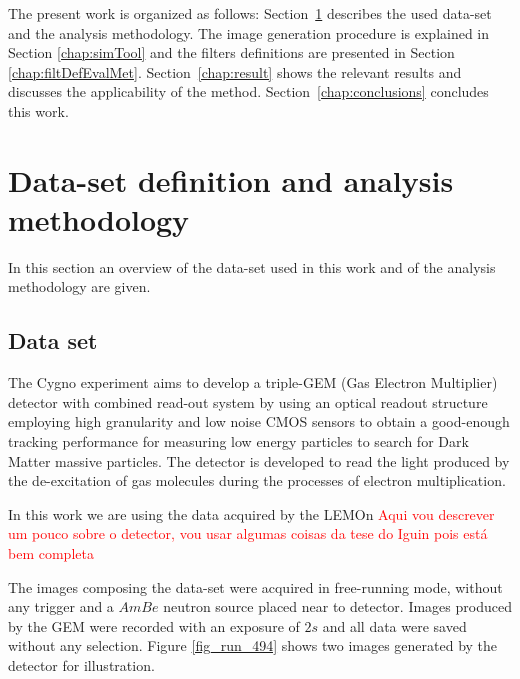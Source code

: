 \documentclass[
        oneside,      %
        english,			
        brazil			 
        ]{abntbibufjf}
\begin{document}
The present work is organized as follows: Section~\ref{chap:metho} describes the used data-set and the analysis methodology. The image generation procedure is explained in Section \ref{chap:simTool} and the filters definitions are presented in Section \ref{chap:filtDefEvalMet}. Section~\ref{chap:result} shows the relevant results and discusses the applicability of the method. Section~\ref{chap:conclusions} concludes this work.


\section{Data-set definition and analysis methodology}
\label{chap:metho}

In this section an overview of the data-set used in this work and of the analysis methodology are given. 


\subsection{Data set}

The  Cygno  experiment  aims  to  develop  a  triple-GEM (Gas Electron Multiplier) detector  with combined read-out system by using an optical readout structure employing high granularity and low noise CMOS sensors to obtain a good-enough tracking performance for measuring low energy particles to search for Dark Matter massive particles. The detector is developed to read the light produced by the de-excitation of gas molecules during the processes of electron multiplication.



In this work we are using the data acquired by the LEMOn
\textcolor{red}{Aqui vou descrever um pouco sobre o detector, vou usar algumas coisas da tese do Iguin pois está bem completa}



The images composing the data-set were acquired in free-running mode, without any trigger and a $AmBe$ neutron source placed near to detector. Images produced by the GEM were recorded with an exposure of $2s$ and all data were saved without any selection. Figure \ref{fig_run_494} shows two images generated by the detector for illustration.
\end{document}
